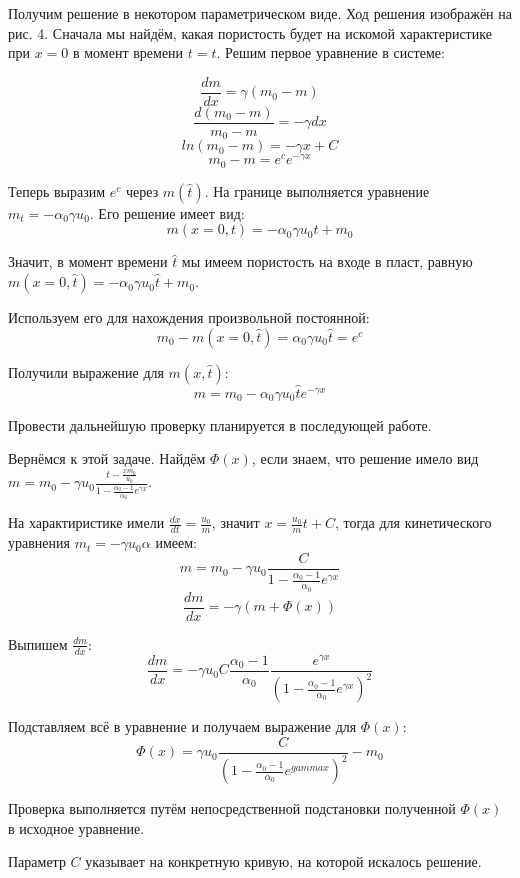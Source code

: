 \par Получим решение в некотором параметрическом виде. Ход решения изображён на рис. 4. Сначала мы найдём, какая пористость будет на искомой характеристике при $x=0$ в момент времени $t = \hat{t}$. Решим первое уравнение в системе:

$$\frac{dm}{dx}=\gamma(m_{0}-m)$$
$$\frac{d(m_{0}-m)}{m_{0}-m}=-\gamma dx$$
$$ln(m_{0}-m)=-\gamma x + C$$
$$m_{0}-m = e^{c}e^{-\gamma x}$$
\par Теперь выразим $e^{c}$ через $m(\hat{t})$. На границе выполняется уравнение $m_{t}=-\alpha_{0}\gamma u_{0}$. Его решение имеет вид: 
$$m(x=0,t)=-\alpha_{0}\gamma u_{0}t+m_{0}$$
\par Значит, в момент времени $\hat{t}$ мы имеем пористость на входе в пласт, равную $m(x=0,\hat{t})=-\alpha_{0}\gamma u_{0}\hat{t}+m_{0}$. 
\par Используем его для нахождения произвольной постоянной:
$$m_{0}-m(x=0,\hat{t})= \alpha_{0}\gamma u_{0}\hat{t} = e^{c}$$
\par Получили выражение для $m(x,\hat{t})$:
$$m =m_{0} -\alpha_{0}\gamma u_{0}\hat{t}e^{-\gamma x}$$
\par Провести дальнейшую проверку планируется в последующей работе.

\par Вернёмся к этой задаче. Найдём $\Phi(x)$, если знаем, что решение имело вид $m=m_{0}-\gamma u_{0}\frac{t-\frac{xm_{0}}{u_{0}}}{1-\frac{\alpha_{0}-1}{\alpha_{0}}e^{\gamma x}}$.
\par На характиристике имели $\frac{dx}{dt}=\frac{u_{0}}{m}$, значит $x=\frac{u_{0}}{m}t+C$, тогда для кинетического уравнения $m_{t}=-\gamma u_{0}\alpha$ имеем:
$$m=m_{0}-\gamma u_{0}\frac{C}{1-\frac{\alpha_{0}-1}{\alpha_{0}}e^{\gamma x}}$$
$$\frac{dm}{dx}=-\gamma(m+\Phi(x))$$
\par Выпишем $\frac{dm}{dx}$:
$$\frac{dm}{dx}=-\gamma u_{0}C\frac{\alpha_{0}-1}{\alpha_{0}}\frac{e^{\gamma x}}{(1-\frac{\alpha_{0}-1}{\alpha_{0}}e^{\gamma x})^{2}}$$
\par Подставляем всё в уравнение и получаем выражение для $\Phi(x)$:
$$\Phi(x)=\gamma u_{0}\frac{C}{(1-\frac{\alpha_{0}-1}{\alpha_{0}}e^{gamma x})^{2}}-m_{0}$$
\par Проверка выполняется путём непосредственной подстановки полученной $\Phi(x)$ в исходное уравнение.
\par Параметр $C$ указывает на конкретную кривую, на которой искалось решение.